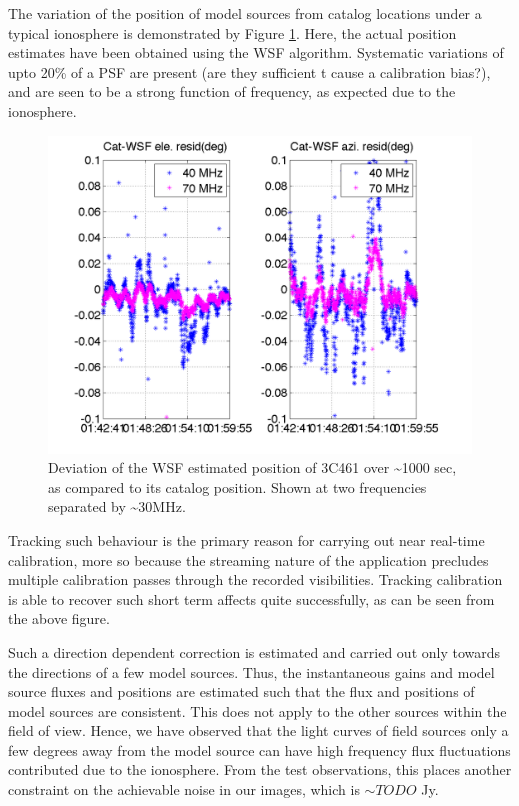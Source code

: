 \documentclass{aa}
\begin{document}
The variation  of the position of  model sources from catalog  locations under a
typical ionosphere is  demonstrated by Figure \ref{fig:Deviation-of-the}.  Here,
the   actual   position   estimates   have   been   obtained   using   the   WSF
algorithm. Systematic  variations of upto  20\% of a  PSF are present  (are they
sufficient t cause a calibration bias?), and are seen to be a strong function of
frequency, as expected due to the ionosphere.

\begin{figure}[tbh]
\includegraphics[width=1\columnwidth]{Figs/CasAsrcposoff}

\caption{\label{fig:Deviation-of-the}Deviation of the WSF estimated position
of 3C461 over \textasciitilde{}1000 sec, as compared to its catalog
position. Shown at two frequencies separated by \textasciitilde{}30MHz.}
\end{figure}


Tracking such  behaviour is the primary  reason for carrying  out near real-time
calibration, more so  because the streaming nature of  the application precludes
multiple  calibration   passes  through  the   recorded  visibilities.  Tracking
calibration is  able to recover such  short term affects  quite successfully, as
can be seen from the above figure.

Such a direction dependent correction  is estimated and carried out only towards
the directions of  a few model sources. Thus, the  instantaneous gains and model
source fluxes  and positions are estimated  such that the flux  and positions of
model sources  are consistent. This does  not apply to the  other sources within
the  field of  view. Hence,  we have  observed that  the light  curves  of field
sources only  a few degrees away from  the model source can  have high frequency
flux fluctuations contributed due to the ionosphere. From the test observations,
this places another  constraint on the achievable noise in  our images, which is
$\sim TODO$ Jy.
\end{document}
